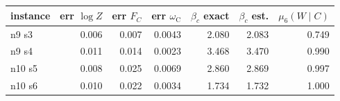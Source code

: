 \begin{tabular}{lrrrrrr}
\toprule
instance & err $\log Z$ & err $F_C$ & err $\omega_{\mathrm C}$ & $\beta_c$ exact & $\beta_c$ est. & $\mu_6(W\mid C)$ \\
\midrule
n9 s3 & 0.006 & 0.007 & 0.0043 & 2.080 & 2.083 & 0.749 \\
n9 s4 & 0.011 & 0.014 & 0.0023 & 3.468 & 3.470 & 0.990 \\
n10 s5 & 0.008 & 0.025 & 0.0069 & 2.860 & 2.869 & 0.997 \\
n10 s6 & 0.010 & 0.022 & 0.0034 & 1.734 & 1.732 & 1.000 \\
\bottomrule
\end{tabular}
